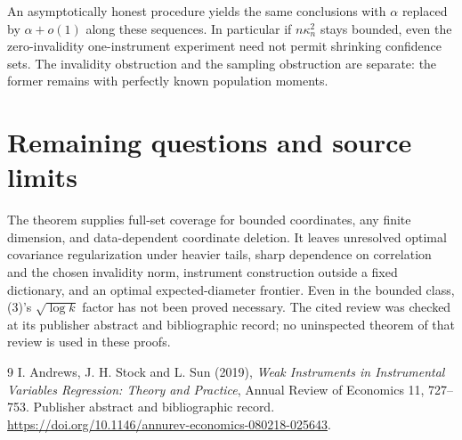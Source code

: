 \documentclass[11pt]{article}
\theoremstyle{remark}
\begin{document}
An asymptotically honest procedure yields the same conclusions with
$\alpha$ replaced by $\alpha+o(1)$ along these sequences. In particular
if $n\kappa_n^2$ stays bounded, even the zero-invalidity one-instrument
experiment need not permit shrinking confidence sets. The invalidity
obstruction and the sampling obstruction are separate: the former remains
with perfectly known population moments.

\section{Remaining questions and source limits}
The theorem supplies full-set coverage for bounded coordinates, any finite
dimension, and data-dependent coordinate deletion. It leaves unresolved
optimal covariance regularization under heavier tails, sharp dependence on
correlation and the chosen invalidity norm, instrument construction outside
a fixed dictionary, and an optimal expected-diameter frontier. Even in the
bounded class, (3)'s $\sqrt{\log k}$ factor has not been proved necessary.
The cited review was checked at its publisher abstract and bibliographic
record; no uninspected theorem of that review is used in these proofs.

\begin{thebibliography}{9}
 I. Andrews, J. H. Stock and L. Sun (2019),
\emph{Weak Instruments in Instrumental Variables Regression: Theory and
Practice}, Annual Review of Economics 11, 727--753. Publisher abstract
and bibliographic record.
\url{https://doi.org/10.1146/annurev-economics-080218-025643}.
\end{thebibliography}
\end{document}
